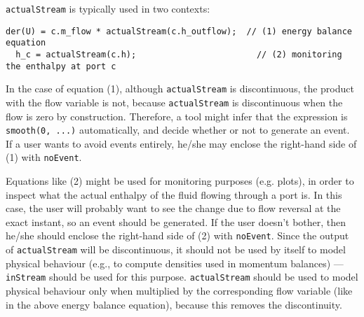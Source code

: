 \begin{nonnormative}
\lstinline!actualStream! is typically used in two contexts:
\begin{lstlisting}[language=modelica]
  der(U) = c.m_flow * actualStream(c.h_outflow);  // (1) energy balance equation
  h_c = actualStream(c.h);                        // (2) monitoring the enthalpy at port c
\end{lstlisting}
In the case of equation (1), although \lstinline!actualStream!
is discontinuous, the product with the flow variable is not, because
\lstinline!actualStream! is discontinuous when the flow is zero by construction.
Therefore, a tool might infer that the expression is \lstinline!smooth(0, ...)!
automatically, and decide whether or not to generate an event. If a user
wants to avoid events entirely, he/she may enclose the right-hand side
of (1) with \lstinline!noEvent!.

Equations like (2) might be used for monitoring purposes (e.g.
plots), in order to inspect what the actual enthalpy of the fluid
flowing through a port is. In this case, the user will probably want to
see the change due to flow reversal at the exact instant, so an event
should be generated. If the user doesn't bother, then he/she should
enclose the right-hand side of (2) with \lstinline!noEvent!. Since the output of
\lstinline!actualStream! will be discontinuous, it should not be used by itself to
model physical behaviour (e.g., to compute densities used in momentum
balances) --- \lstinline!inStream! should be used for this purpose.
\lstinline!actualStream! should be used to model physical behaviour only when
multiplied by the corresponding flow variable (like in the above energy
balance equation), because this removes the discontinuity.
\end{nonnormative}
